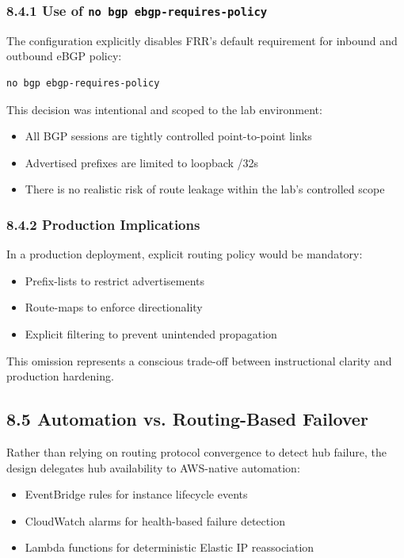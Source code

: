 \documentclass[11pt]{article}
\begin{document}
\subsubsection{8.4.1 Use of \texttt{no bgp ebgp-requires-policy}}
\label{subsubsec:no-ebgp-requires-policy}

The configuration explicitly disables FRR’s default requirement for inbound and outbound eBGP policy:

\begin{verbatim}
no bgp ebgp-requires-policy
\end{verbatim}

This decision was intentional and scoped to the lab environment:
\begin{itemize}
\item All BGP sessions are tightly controlled point-to-point links
\item Advertised prefixes are limited to loopback /32s
\item There is no realistic risk of route leakage within the lab’s controlled scope
\end{itemize}

\subsubsection{8.4.2 Production Implications}
\label{subsubsec:bgp-production-implications}

In a production deployment, explicit routing policy would be mandatory:
\begin{itemize}
\item Prefix-lists to restrict advertisements
\item Route-maps to enforce directionality
\item Explicit filtering to prevent unintended propagation
\end{itemize}

This omission represents a conscious trade-off between instructional clarity and production hardening.

\subsection{8.5 Automation vs. Routing-Based Failover}
\label{subsec:automation-vs-routing-failover}

Rather than relying on routing protocol convergence to detect hub failure, the design delegates hub availability to AWS-native automation:
\begin{itemize}
\item EventBridge rules for instance lifecycle events
\item CloudWatch alarms for health-based failure detection
\item Lambda functions for deterministic Elastic IP reassociation
\end{itemize}
\end{document}
